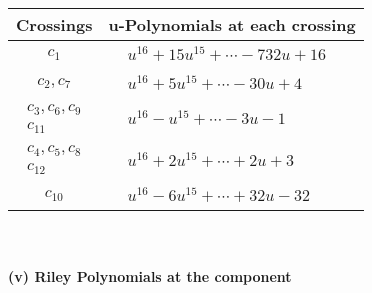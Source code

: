 \documentclass[1p]{elsarticle_modified}
\theoremstyle{definition}
\begin{document}
\begin{tabular}{m{50pt}|m{274pt}}
Crossings & \hspace{64pt}u-Polynomials at each crossing \\
\hline $$\begin{aligned}c_{1}\end{aligned}$$&$\begin{aligned}
&u^{16}+15 u^{15}+\cdots-732 u+16
\end{aligned}$\\
\hline $$\begin{aligned}c_{2},c_{7}\end{aligned}$$&$\begin{aligned}
&u^{16}+5 u^{15}+\cdots-30 u+4
\end{aligned}$\\
\hline $$\begin{aligned}c_{3},c_{6},c_{9}\\c_{11}\end{aligned}$$&$\begin{aligned}
&u^{16}- u^{15}+\cdots-3 u-1
\end{aligned}$\\
\hline $$\begin{aligned}c_{4},c_{5},c_{8}\\c_{12}\end{aligned}$$&$\begin{aligned}
&u^{16}+2 u^{15}+\cdots+2 u+3
\end{aligned}$\\
\hline $$\begin{aligned}c_{10}\end{aligned}$$&$\begin{aligned}
&u^{16}-6 u^{15}+\cdots+32 u-32
\end{aligned}$\\
\hline
\end{tabular}\\~\\
\newpage\renewcommand{\arraystretch}{1}
\flushleft \textbf{(v) Riley Polynomials at the component}\newline \\
\end{document}
